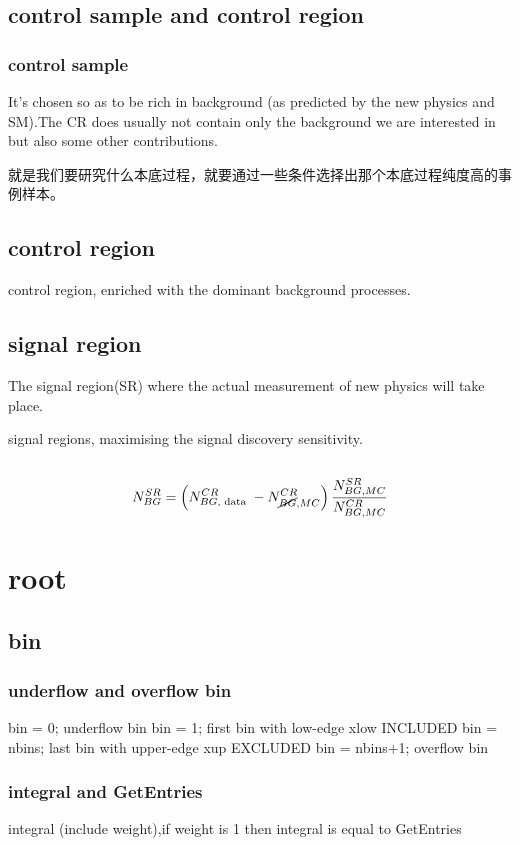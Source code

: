 \documentclass{ctexart}
\begin{document}
\subsection{control sample and control region}
\subsubsection{control sample}
It's chosen so as to be rich in background (as predicted by the new physics and SM).The CR does usually not contain only the background we are interested in but also some other contributions.\par
就是我们要研究什么本底过程，就要通过一些条件选择出那个本底过程纯度高的事例样本。

\subsection{control region}
control region, enriched with the dominant background processes.
\subsection{signal region}
The signal region(SR) where the actual measurement of new physics will take place.\par
signal regions, maximising the signal discovery sensitivity.
\subsection{}
\begin{equation}
N_{B G}^{S R}=\left(N_{B G, \text { data }}^{C R}-N_{\cancel{BG}, M C}^{C R}\right) \frac{N_{B G, M C}^{S R}}{N_{B G, M C}^{C R}}
\end{equation}
\section{root}
\subsection{bin}
\subsubsection{underflow and overflow bin}
bin = 0;       underflow bin
bin = 1;       first bin with low-edge xlow INCLUDED
bin = nbins;   last bin with upper-edge xup EXCLUDED
bin = nbins+1; overflow bin
\subsubsection{integral and GetEntries}
integral (include weight),if weight is 1 then integral is equal to GetEntries
\end{document}
